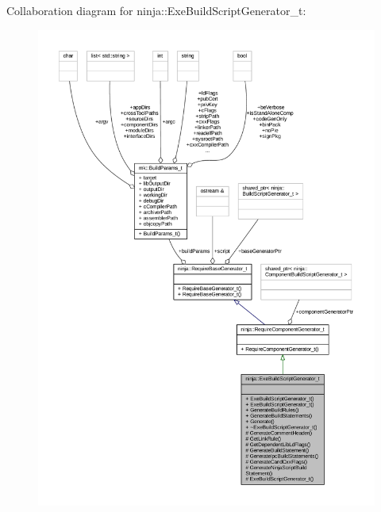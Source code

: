 Collaboration diagram for ninja\+:\+:Exe\+Build\+Script\+Generator\+\_\+t\+:
\nopagebreak
\begin{figure}[H]
\begin{center}
\leavevmode
\includegraphics[width=350pt]{classninja_1_1_exe_build_script_generator__t__coll__graph}
\end{center}
\end{figure}
